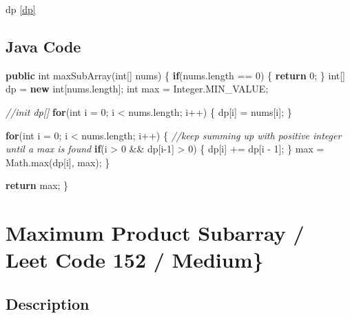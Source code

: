 \documentclass[]{book}
\newenvironment{Shaded}{\begin{snugshade}}{\end{snugshade}}
\newcommand{\BuiltInTok}[1]{#1}
\newcommand{\CommentTok}[1]{\textcolor[rgb]{0.56,0.35,0.01}{\textit{#1}}}
\newcommand{\DataTypeTok}[1]{\textcolor[rgb]{0.13,0.29,0.53}{#1}}
\newcommand{\DecValTok}[1]{\textcolor[rgb]{0.00,0.00,0.81}{#1}}
\newcommand{\FunctionTok}[1]{\textcolor[rgb]{0.00,0.00,0.00}{#1}}
\newcommand{\KeywordTok}[1]{\textcolor[rgb]{0.13,0.29,0.53}{\textbf{#1}}}
\newcommand{\NormalTok}[1]{#1}
\begin{document}
dp \ref{dp}

\hypertarget{java-code-23}{%
\subsection{Java Code}\label{java-code-23}}

\begin{Shaded}
\begin{Highlighting}[]
\KeywordTok{public} \DataTypeTok{int} \FunctionTok{maxSubArray}\NormalTok{(}\DataTypeTok{int}\NormalTok{[] nums) \{}
    \KeywordTok{if}\NormalTok{(nums.}\FunctionTok{length}\NormalTok{ == }\DecValTok{0}\NormalTok{) \{}
        \KeywordTok{return} \DecValTok{0}\NormalTok{;}
\NormalTok{    \}}
    \DataTypeTok{int}\NormalTok{[] dp = }\KeywordTok{new} \DataTypeTok{int}\NormalTok{[nums.}\FunctionTok{length}\NormalTok{];}
    \DataTypeTok{int}\NormalTok{ max = }\BuiltInTok{Integer}\NormalTok{.}\FunctionTok{MIN_VALUE}\NormalTok{;}

    \CommentTok{//init dp[]}
    \KeywordTok{for}\NormalTok{(}\DataTypeTok{int}\NormalTok{ i = }\DecValTok{0}\NormalTok{; i < nums.}\FunctionTok{length}\NormalTok{; i++) \{}
\NormalTok{        dp[i] = nums[i];}
\NormalTok{    \}}

    \KeywordTok{for}\NormalTok{(}\DataTypeTok{int}\NormalTok{ i = }\DecValTok{0}\NormalTok{; i < nums.}\FunctionTok{length}\NormalTok{; i++) \{}
        \CommentTok{//keep summing up with positive integer until a max is found}
        \KeywordTok{if}\NormalTok{(i > }\DecValTok{0}\NormalTok{ && dp[i}\DecValTok{-1}\NormalTok{] > }\DecValTok{0}\NormalTok{) \{}
\NormalTok{            dp[i] += dp[i - }\DecValTok{1}\NormalTok{];}
\NormalTok{        \}}
\NormalTok{        max = }\BuiltInTok{Math}\NormalTok{.}\FunctionTok{max}\NormalTok{(dp[i], max);}
\NormalTok{    \}}

    \KeywordTok{return}\NormalTok{ max;}
\NormalTok{\}}
\end{Highlighting}
\end{Shaded}

\hypertarget{maximum-product-subarray-leet-code-152-medium}{%
\section{Maximum Product Subarray / Leet Code 152 / Medium\}}\label{maximum-product-subarray-leet-code-152-medium}}

\hypertarget{description-27}{%
\subsection{Description}\label{description-27}}
\end{document}

